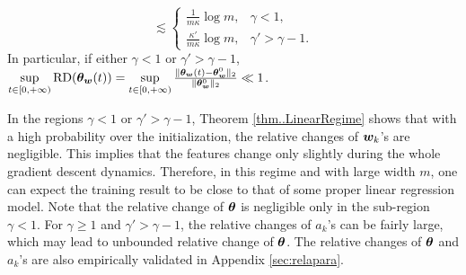 \documentclass{article}
\begin{document}
\begin{thm}
\begin{enumerate}[resume*]
\begin{equation}
                  \lesssim
                  \left\{
                  \begin{array}{cc}
                      \frac{1}{m\kappa}\log m,       & \gamma<1,         \\
                      \frac{\kappa'}{m\kappa}\log m, & \gamma'>\gamma-1.
                  \end{array}\right.
              \end{equation}
              In particular, if either $\gamma<1$ or $\gamma'>\gamma-1$, $\sup\limits_{t\in[0,+\infty)}\mathrm{RD}(\bm{\theta}_{\bm{w}}(t))=\sup\limits_{t\in[0,+\infty)}\frac{\lVert\bm{\theta}_{\bm{w}}(t)-\bm{\theta}_{\bm{w}}^0\rVert_2}{\lVert\bm{\theta}_{\bm{w}}^0\rVert_2}\ll1$.
    \end{enumerate}
\end{thm}
\begin{rmk}
    In the regions $\gamma<1$ or $\gamma'>\gamma-1$,
    Theorem \ref{thm..LinearRegime} shows that with a high probability over the initialization, the relative changes of $\bm{w}_k$'s are negligible. This implies that the features change only slightly during the whole gradient descent dynamics. Therefore, in this regime and with large width $m$, one can expect the training result to be close to that of some proper linear regression model. Note that the relative change of $\bm{\theta}$ is negligible only in the sub-region $\gamma<1$. For $\gamma\geq 1$ and $\gamma'>\gamma-1$, the relative changes of $a_k$'s can be fairly large, which may lead to unbounded relative change of $\bm{\theta}$. The relative changes of $\bm{\theta}$ and $a_k$'s are also empirically validated in Appendix \ref{sec:relapara}.
\end{rmk}
\end{document}

